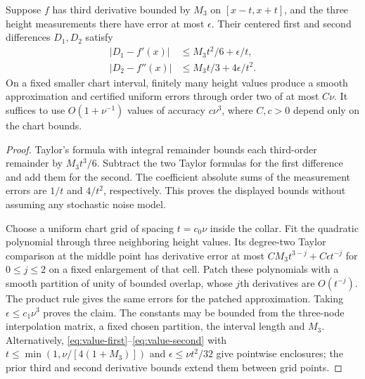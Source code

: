 \begin{lemma}
\label{lem:value-differences}
Suppose $f$ has third derivative bounded by $M_3$ on $[x-t,x+t]$,
and the three height measurements there have error at most $\epsilon$.
Their centered first and second differences $D_1,D_2$ satisfy
\begin{align}
 |D_1-f'(x)|&\le M_3t^2/6+\epsilon/t,\label{eq:value-first}\\
 |D_2-f''(x)|&\le M_3t/3+4\epsilon/t^2.\label{eq:value-second}
\end{align}
On a fixed smaller chart interval, finitely many height values produce
a smooth approximation and certified uniform errors through order two
of at most $C\nu$. It suffices to use $O(1+\nu^{-1})$ values of
accuracy $c\nu^3$, where $C,c>0$ depend only on the chart bounds.
\end{lemma}
\begin{proof}
Taylor's formula with integral remainder bounds each third-order
remainder by $M_3t^3/6$. Subtract the two Taylor formulas for the first
difference and add them for the second. The coefficient absolute sums
of the measurement errors are $1/t$ and $4/t^2$, respectively. This
proves the displayed bounds without assuming any stochastic noise model.

Choose a uniform chart grid of spacing $t=c_0\nu$ inside the collar.
Fit the quadratic polynomial through three neighboring height values.
Its degree-two Taylor comparison at the middle point has derivative
error at most $C M_3t^{3-j}+C\epsilon t^{-j}$ for $0\le j\le2$
on a fixed enlargement of that cell. Patch these polynomials with a
smooth partition of unity of bounded overlap, whose $j$th derivatives
are $O(t^{-j})$. The product rule gives the same errors for the patched
approximation. Taking $\epsilon\le c_1\nu^3$ proves the claim.
The constants may be bounded from the three-node interpolation matrix,
a fixed chosen partition, the interval length and $M_3$. Alternatively,
\eqref{eq:value-first}--\eqref{eq:value-second} with
$t\le\min(1,\nu/[4(1+M_3)])$ and
$\epsilon\le\nu t^2/32$ give pointwise enclosures; the prior third
and second derivative bounds extend them between grid points.
\end{proof}

